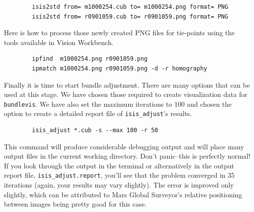 \begin{verbatim}
        isis2std from= m1000254.cub to= m1000254.png format= PNG
        isis2std from= r0901059.cub to= r0901059.png format= PNG
\end{verbatim}

Here is how to process those newly created PNG files for tie-points
using the tools available in Vision Workbench.

\begin{verbatim}
        ipfind  m1000254.png r0901059.png
        ipmatch m1000254.png r0901059.png -d -r homography
\end{verbatim}

\begin{center}
\end{center}

Finally it is time to start bundle adjustment. There are many options
that can be used at this stage.  We have chosen those required to
create visualization data for \texttt{bundlevis}.  We have also set
the maximum iterations to 100 and chosen the option to create a
detailed report file of \texttt{isis\_adjust}'s results.

\begin{verbatim}
        isis_adjust *.cub -s --max 100 -r 50
\end{verbatim}

This command will produce considerable debugging output and will
place many output files in the current working directory. Don't
panic--this is perfectly normal! If you look through the output in
the terminal or alternatively in the output report file,
\texttt{isis\_adjust.report}, you'll see that the problem converged
in 35 iterations (again, your results may vary slightly).  The error
is improved only slightly, which can be attributed to Mars Global
Surveyor's relative positioning between images being pretty good
for this case.

